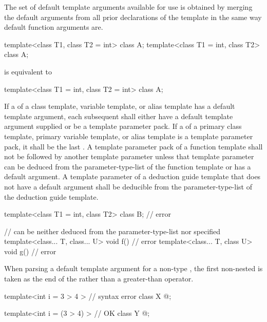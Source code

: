 \pnum
The set of default template arguments
available for use is obtained by merging the default arguments
from all prior declarations of the template in the
same way default function arguments are.
\begin{example}
\begin{codeblock}
template<class T1, class T2 = int> class A;
template<class T1 = int, class T2> class A;
\end{codeblock}
is equivalent to
\begin{codeblock}
template<class T1 = int, class T2 = int> class A;
\end{codeblock}
\end{example}

\pnum
If a 
of a class template, variable template, or alias template has
a default template argument,
each subsequent 
shall either have a default template argument supplied or
be a template parameter pack.
If a  of
a primary class template, primary variable template, or alias template
is a template parameter pack,
it shall be the last .
A template parameter pack of a function template
shall not be followed by another template parameter
unless that template parameter can be deduced from the
parameter-type-list of the function template or
has a default argument.
A template parameter of a deduction guide template
that does not have a default argument shall be deducible
from the parameter-type-list of the deduction guide template.
\begin{example}
\begin{codeblock}
template<class T1 = int, class T2> class B;     // error

//  can be neither deduced from the parameter-type-list nor specified
template<class... T, class... U> void f() { }   // error
template<class... T, class U> void g() { }      // error
\end{codeblock}
\end{example}

%
\pnum
When parsing a default template argument
for a non-type ,
the first non-nested \tcode{>} is taken as
the end of the 
rather than a greater-than operator.
\begin{example}
\begin{codeblock}
template<int i = 3 > 4 >        // syntax error
class X { @\commentellip@ };

template<int i = (3 > 4) >      // OK
class Y { @\commentellip@ };
\end{codeblock}
\end{example}

